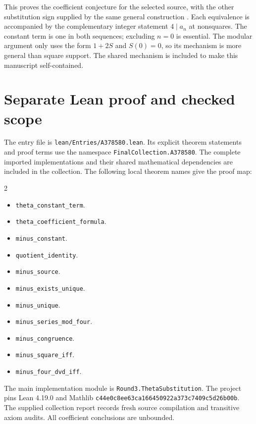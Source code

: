 \documentclass[11pt,a4paper]{article}
\theoremstyle{remark}
\begin{document}
This proves the coefficient conjecture for the selected source, with the
other substitution sign supplied by the same general construction
\cite{oeis580,oeis581}. Each equivalence is accompanied
by the complementary integer statement $4\mid a_n$ at nonsquares.
The constant term is one in both sequences; excluding $n=0$ is essential.
The modular argument only uses the form $1+2S$ and $S(0)=0$, so its
mechanism is more general than square support. The shared mechanism is included to make this manuscript self-contained.


\section{Separate Lean proof and checked scope}

The entry file is \nolinkurl{lean/Entries/A378580.lean}. Its explicit
theorem statements and proof terms use the namespace
\nolinkurl{FinalCollection.A378580}. The complete imported implementations
and their shared mathematical dependencies are included in the collection.
The following local theorem names give the proof map:

\begin{multicols}{2}\raggedright\begin{itemize}\setlength{\itemsep}{2pt}\setlength{\parsep}{0pt}
\item \nolinkurl{theta_constant_term}.
\item \nolinkurl{theta_coefficient_formula}.
\item \nolinkurl{minus_constant}.
\item \nolinkurl{quotient_identity}.
\item \nolinkurl{minus_source}.
\item \nolinkurl{minus_exists_unique}.
\item \nolinkurl{minus_unique}.
\item \nolinkurl{minus_series_mod_four}.
\item \nolinkurl{minus_congruence}.
\item \nolinkurl{minus_square_iff}.
\item \nolinkurl{minus_four_dvd_iff}.
\end{itemize}\end{multicols}

The main implementation module is \nolinkurl{Round3.ThetaSubstitution}.
The project pins Lean 4.19.0 and Mathlib
\nolinkurl{c44e0c8ee63ca166450922a373c7409c5d26b00b}.
The supplied collection report records fresh source compilation and
transitive axiom audits. All coefficient conclusions are unbounded.
\end{document}
